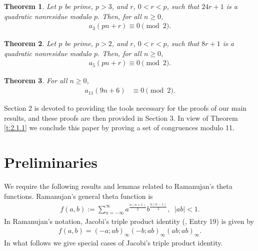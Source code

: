 \documentclass[a4paper,12pt,reqno]{amsart}
\newtheorem{theorem}{Theorem}[section]
\numberwithin{equation}{section}
\begin{document}

     \begin{theorem}\label{t:2.1.7}
	Let $p$ be prime, $p > 3$, and $r$, $0 < r < p$, such that $24r+1$ is a quadratic nonresidue
	modulo $p$. Then, for all $n \geq 0$, 
	\begin{align*}
		a_3(pn+r) \equiv 0 \pmod{2}.
	\end{align*}
	\end{theorem}

	\begin{theorem}\label{t:2.1.8}
	Let $p$ be prime, $p > 2$, and $r$, $0 < r < p$, such that $8r+1$ is a quadratic nonresidue
			modulo $p$. Then, for all $n \geq 0$, 
			\begin{align*}
				a_5(pn+r) \equiv 0 \pmod{2}.
			\end{align*}
					\end{theorem}
\begin{theorem}\label{t:2.1.10}
			For all $n \geq 0$,
		\begin{align*}
		a_{11}(9n+6) &\equiv 0 \pmod {2}.
		\end{align*}
\end{theorem}

 

	 Section 2 is devoted to providing the tools necessary for the proofs of our main results, and these proofs are then provided in Section 3. In view of Theorem \ref{t:2.1.1} we conclude this paper  by proving a set of congruences modulo 11.

\section{Preliminaries}
We require the following results and lemmas related to Ramanujan's theta functions. 
Ramanujan's general theta function is 
\begin{align*}
	f(a,b):= \sum_{n=-\infty}^{\infty}a^{\frac{n(n+1)}{2}}b^{\frac{n(n-1)}{2}},\;\;|ab|<1.
\end{align*}
In Ramanujan's notation,  Jacobi's triple product identity (\cite{r3}, Entry 19) is given by
\begin{align*}
	f(a,b)=(-a;ab)_\infty(-b;ab)_\infty(ab;ab)_\infty.
\end{align*}
In what follows we give special cases of Jacobi's triple product identity.
\end{document}
